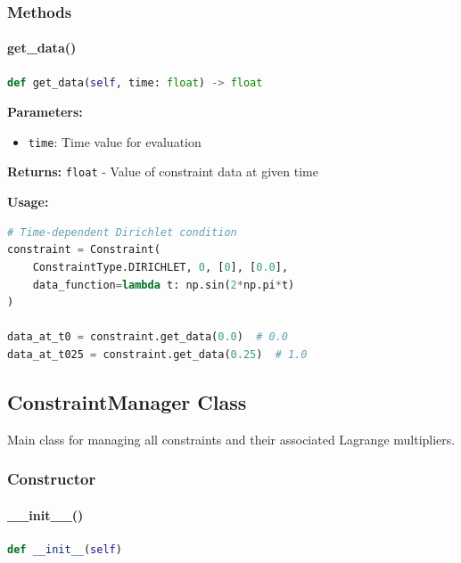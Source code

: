 \subsubsection{Methods}

\paragraph{get\_data()}\leavevmode
\begin{lstlisting}[language=Python, caption=Get Data Method]
def get_data(self, time: float) -> float
\end{lstlisting}

\textbf{Parameters:}
\begin{itemize}
    \item \texttt{time}: Time value for evaluation
\end{itemize}

\textbf{Returns:} \texttt{float} - Value of constraint data at given time

\textbf{Usage:}
\begin{lstlisting}[language=Python, caption=Get Data Usage]
# Time-dependent Dirichlet condition
constraint = Constraint(
    ConstraintType.DIRICHLET, 0, [0], [0.0],
    data_function=lambda t: np.sin(2*np.pi*t)
)

data_at_t0 = constraint.get_data(0.0)  # 0.0
data_at_t025 = constraint.get_data(0.25)  # 1.0
\end{lstlisting}

\subsection{ConstraintManager Class}
\label{subsec:constraint_manager_class}

Main class for managing all constraints and their associated Lagrange multipliers.

\subsubsection{Constructor}

\paragraph{\_\_init\_\_()}\leavevmode
\begin{lstlisting}[language=Python, caption=ConstraintManager Constructor]
def __init__(self)
\end{lstlisting}

